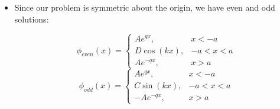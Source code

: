 \begin{itemize}
\begin{itemize}
\begin{enumerate}
          \end{enumerate}

        \item Since our problem is symmetric about the origin, we have even and odd solutions:

          $$\phi_{even}(x)=\left\{\begin{array}{ll} Ae^{qx},& x<-a\\D\cos(kx),&-a<x<a\\ Ae^{-qx},&x>a\end{array}$$
          $$\phi_{odd}(x)=\left\{\begin{array}{ll} Ae^{qx},& x<-a\\C\sin(kx),&-a<x<a\\ -Ae^{-qx},&x>a\end{array}$$

    \end{itemize}

\end{itemize}



